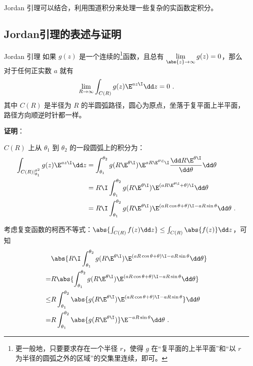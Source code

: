 

Jordan 引理可以结合，利用围道积分来处理一些复杂的实函数定积分。

\subsection{Jordan引理的表述与证明}

\begin{theorem}{Jordan 引理}\label{the_JdLem_1}
如果 $g(z)$ 是一个连续的\footnote{更一般地，只要要求存在一个半径 $r$，使得 $g$ 在“复平面的上半平面”和“以 $r$ 为半径的圆弧之外的区域”的交集里连续，即可。}函数，且总有 $\lim\limits_{\abs{z}\to\infty}g(z)=0$，那么对于任何正实数 $a$ 就有
\begin{equation}
\lim\limits_{R\to \infty}\int_{C(R)}g(z)\E^{az\I}\dd z=0~.
\end{equation}
其中 $C(R)$ 是半径为 $R$ 的半圆弧路径，圆心为原点，坐落于复平面上半平面，路径方向顺逆时针都一样。


\end{theorem}

\textbf{证明}：

$C(R)$ 上从 $\theta_1$ 到 $\theta_2$ 的一段圆弧上的积分为：
\begin{equation}
\begin{aligned}
\int_{C(R)|_{\theta_1}^{\theta^2}}g(z)\E^{az\I}\dd z&=\int_{\theta_1}^{\theta_2}g( R\E^{\theta\I} )\E^{aR\E^{\theta\I}\I}\frac{\dd R\E^{\theta\I}}{\dd \theta}\dd\theta\\
&=R\I\int_{\theta_1}^{\theta_2}g(R\E^{\theta\I})\E^{(aR\E^{\theta\I}+\theta)\I}\dd\theta\\
&=R\I\int_{\theta_1}^{\theta_2}g(R\E^{\theta\I})\E^{(aR\cos\theta+\theta)\I-aR\sin\theta}\dd\theta~.
\end{aligned}
\end{equation}


考虑复变函数的柯西不等式：$\abs{\int_{C(R)}f(z)\dd z} \leq \int_{C(R)}\abs{f(z)}\dd z$，可知
\begin{equation}\label{eq_JdLem_4}
\begin{aligned}
&\abs{R\I\int_{\theta_1}^{\theta_2}g(R\E^{\theta\I})\E^{(aR\cos\theta+\theta)\I-aR\sin\theta}\dd\theta}\\
=&R\abs{\int_{\theta_1}^{\theta_2}g(R\E^{\theta\I})\E^{(aR\cos\theta+\theta)\I-aR\sin\theta}\dd\theta}\\
\leq&R\int_{\theta_1}^{\theta_2}\abs{g(R\E^{\theta\I})\E^{(aR\cos\theta+\theta)\I-aR\sin\theta}}\dd\theta\\
=&R\int_{\theta_1}^{\theta_2}\abs{g(R\E^{\theta\I})}\E^{-aR\sin\theta}\dd\theta~.
\end{aligned}
\end{equation}

